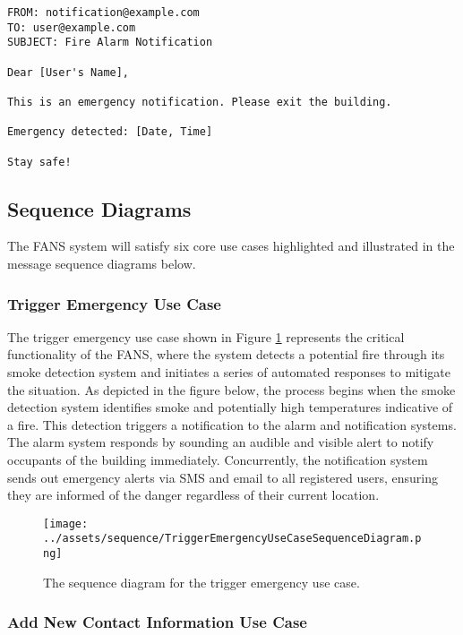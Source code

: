 {
\tiny
\begin{lstlisting}[label={lst:email},caption={Email notification for detected emergency in FANS.}]
FROM: notification@example.com
TO: user@example.com
SUBJECT: Fire Alarm Notification

Dear [User's Name],

This is an emergency notification. Please exit the building.

Emergency detected: [Date, Time]

Stay safe!
\end{lstlisting}
}

\subsection{Sequence Diagrams}

The FANS system will satisfy six core use cases highlighted and illustrated in the message sequence diagrams below.

\subsubsection{Trigger Emergency Use Case}

The trigger emergency use case shown in Figure \ref{fig:trigger-emerg} represents the critical functionality of the
FANS, where the system detects a potential fire through its smoke detection system and initiates a series of automated
responses to mitigate the situation. As depicted in the figure below, the process begins when the smoke detection system 
identifies smoke and potentially high temperatures indicative of a fire. This detection triggers a notification to the 
alarm and notification systems. The alarm system responds by sounding an audible and visible alert to notify occupants 
of the building immediately. Concurrently, the notification system sends out emergency alerts via SMS and email to all 
registered users, ensuring they are informed of the danger regardless of their current location.

\begin{figure}
    \centering
    \texttt{[image: ../assets/sequence/TriggerEmergencyUseCaseSequenceDiagram.png]}
    \caption{The sequence diagram for the trigger emergency use case.}
    \label{fig:trigger-emerg}
\end{figure}

\subsubsection{Add New Contact Information Use Case}

